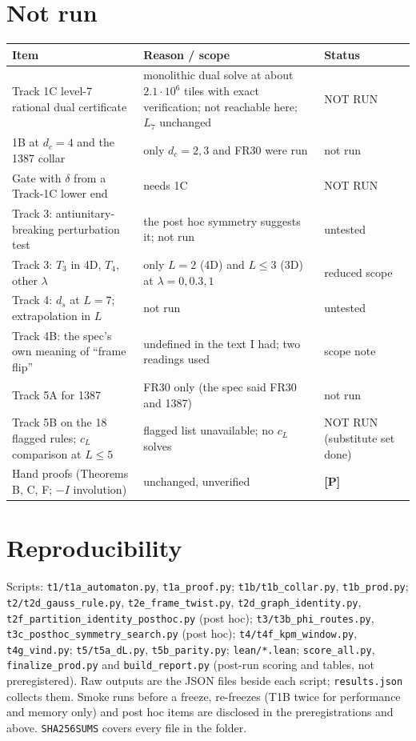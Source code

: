 \documentclass[10pt]{article}
\newcommand{\lab}[1]{\textbf{[#1]}}
\begin{document}
\section{Not run}
\begin{longtable}{p{3.8cm}p{8.6cm}p{2.4cm}}
\toprule Item & Reason / scope & Status\\ \midrule\endhead
Track 1C level-7 rational dual certificate & monolithic dual solve at about $2.1\cdot10^6$ tiles with exact verification; not reachable here; $L_7$ unchanged & NOT RUN\\
1B at $d_c=4$ and the 1387 collar & only $d_c=2,3$ and FR30 were run & not run\\
Gate with $\delta$ from a Track-1C lower end & needs 1C & NOT RUN\\
Track 3: antiunitary-breaking perturbation test & the post hoc symmetry suggests it; not run & untested\\
Track 3: $T_3$ in 4D, $T_4$, other $\lambda$ & only $L=2$ (4D) and $L\le3$ (3D) at $\lambda=0,0.3,1$ & reduced scope\\
Track 4: $d_s$ at $L=7$; extrapolation in $L$ & not run & untested\\
Track 4B: the spec's own meaning of ``frame flip'' & undefined in the text I had; two readings used & scope note\\
Track 5A for 1387 & FR30 only (the spec said FR30 and 1387) & not run\\
Track 5B on the 18 flagged rules; $c_L$ comparison at $L\le5$ & flagged list unavailable; no $c_L$ solves & NOT RUN (substitute set done)\\
Hand proofs (Theorems B, C, F; $-I$ involution) & unchanged, unverified & \lab{P}\\
\bottomrule
\end{longtable}

\section{Reproducibility}
Scripts: \texttt{t1/t1a\_automaton.py}, \texttt{t1a\_proof.py}; \texttt{t1b/t1b\_collar.py}, \texttt{t1b\_prod.py}; \texttt{t2/t2d\_gauss\_rule.py}, \texttt{t2e\_frame\_twist.py}, \texttt{t2d\_graph\_identity.py}, \texttt{t2f\_partition\_identity\_posthoc.py} (post hoc); \texttt{t3/t3b\_phi\_routes.py}, \texttt{t3c\_posthoc\_symmetry\_search.py} (post hoc); \texttt{t4/t4f\_kpm\_window.py}, \texttt{t4g\_vind.py}; \texttt{t5/t5a\_dL.py}, \texttt{t5b\_parity.py}; \texttt{lean/*.lean}; \texttt{score\_all.py}, \texttt{finalize\_prod.py} and \texttt{build\_report.py} (post-run scoring and tables, not preregistered). Raw outputs are the JSON files beside each script; \texttt{results.json} collects them. Smoke runs before a freeze, re-freezes (T1B twice for performance and memory only) and post hoc items are disclosed in the preregistrations and above. \texttt{SHA256SUMS} covers every file in the folder.
\end{document}
